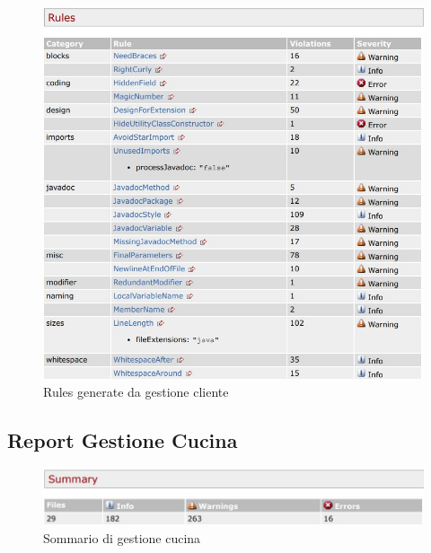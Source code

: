 \begin{figure}[htbp]
	\centering
	\includegraphics[scale=0.8]{iterazione1/images/Cs_rules_Gestione_Cliente.jpg}
	\caption{Rules generate da gestione cliente\label{fig:Cs_Rules_Gestione_Cliente}}
\end{figure}

\newpage

\subsection{Report Gestione Cucina}

\begin{figure}[htbp]
	\centering
	\includegraphics[scale=0.6]{iterazione1/images/Cs_Summary_Gestione_Cucina.jpg}
	\caption{Sommario di gestione cucina\label{fig:Cs_Summary_Gestione_Cucina}}
\end{figure}

